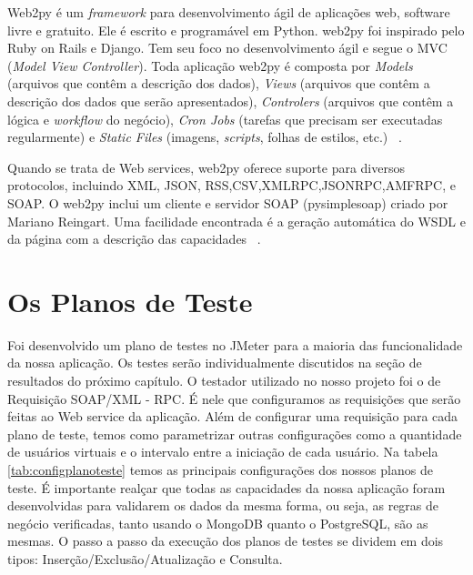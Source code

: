 Web2py é um \textit{framework} para desenvolvimento ágil de aplicações web, software livre e gratuito. Ele é escrito e programável em Python. web2py foi inspirado pelo Ruby on Rails e Django. Tem seu foco no desenvolvimento ágil e segue o MVC (\textit{Model View Controller}). Toda aplicação web2py é composta por \textit{Models} (arquivos que contêm a descrição dos dados), \textit{Views} (arquivos que contêm a descrição dos dados que serão apresentados), \textit{Controlers} (arquivos que contêm a lógica e \textit{workflow} do negócio), \textit{Cron Jobs} (tarefas que precisam ser executadas regularmente) e \textit{Static Files} (imagens, \textit{scripts}, folhas de estilos, etc.) ~\cite{siteweb2py}.

Quando se trata de Web services, web2py oferece suporte para diversos protocolos, incluindo XML, JSON, RSS,CSV,XMLRPC,JSONRPC,AMFRPC, e SOAP.  O web2py inclui um cliente e servidor SOAP (pysimplesoap) criado por Mariano Reingart. Uma facilidade encontrada é a geração automática do WSDL e da página com a descrição das capacidades ~\cite{siteweb2py}.

\section{Os Planos de Teste}

Foi desenvolvido um plano de testes no JMeter para a maioria das funcionalidade da nossa aplicação. Os testes serão individualmente discutidos na seção de resultados do próximo capítulo. O testador utilizado no nosso projeto foi o de Requisição SOAP/XML - RPC. É nele que configuramos as requisições que serão feitas ao Web service da aplicação. Além de configurar uma requisição para cada plano de teste, temos como parametrizar outras configurações como a quantidade de usuários virtuais e o intervalo entre a iniciação de cada usuário. Na tabela \ref{tab:configplanoteste} temos as principais configurações dos nossos planos de teste. É importante realçar que todas as capacidades da nossa aplicação foram desenvolvidas para validarem os dados da mesma forma, ou seja, as regras de negócio verificadas, tanto usando o MongoDB quanto o PostgreSQL, são as mesmas. O passo a passo da execução dos planos de testes se dividem em dois tipos: Inserção/Exclusão/Atualização e Consulta.

